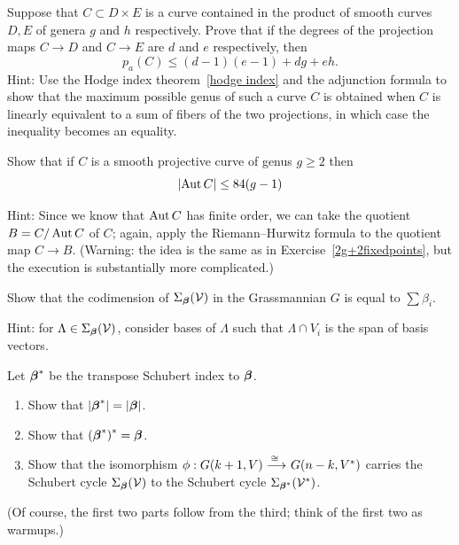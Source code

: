 \begin{exercise}\label{curve in a product}
Suppose that $C\subset D\times E$ is a curve contained in the product
of smooth curves $D,E$ of genera $g$ and $h$ respectively.
Prove that if the degrees of the projection maps $C \to D$ and $C\to E$
are $d$ and $e$ respectively,
then
$$
p_a(C)\leq (d-1)(e-1) +dg+eh.
$$
Hint:  Use the Hodge index theorem~\ref{hodge index} and the adjunction
%
%
formula to show that the maximum possible genus of such
a curve $C$ is obtained when $C$ is linearly equivalent to a sum of
fibers of the two projections, in which case the inequality
becomes an equality.
\end{exercise}

\begin{exercise}\label{84(g-1)}
Show that if $C$ is a smooth projective curve of genus $g \geq 2$ then
$$
|\!\operatorname{Aut} C| \leq 84(g-1)
$$

Hint: Since we know that $\operatorname{Aut} C$ has finite order, we can take
the quotient $B = C/\operatorname{Aut} C$ of $C$; again, apply 
the Riemann--Hurwitz formula
%
%
to the quotient map $C \to B$. (Warning: the idea is the same as in
Exercise~\ref{2g+2fixedpoints}, but the execution is substantially
more complicated.)
\end{exercise}


\begin{exercise}\label{codim Schubert}
Show that the codimension of $\Sigma_{{\boldsymbol{\beta}}}({\mathcal V})$ in the
%
Grassmannian $G$ is equal to $\sum \beta_i$.

Hint: for $\Lambda \in \Sigma_{{\boldsymbol{\beta}}}({\mathcal V})$, consider bases of
$\Lambda$ such that $\Lambda \cap V_i$ is the span of basis vectors.
\end{exercise}

\begin{exercise}\label{Schubert duality}
Let ${{\boldsymbol{\beta}}}^*$ be
the transpose Schubert index to ${\boldsymbol{\beta}}$.
\begin{enumerate}
\item  Show that $|{\boldsymbol{\beta}}^*| = |{\boldsymbol{\beta}}|$.
\item Show that $(\bbeta^*){\vphantom{\bbeta}}^* = \bbeta$. %
\item Show that the isomorphism $\phi : G(k+1, V) \ruto{\,\cong} 
G(n-k, V^*)$ carries the Schubert cycle $\Sigma_{\boldsymbol{\beta}}({\mathcal V})$ to the
Schubert cycle $\Sigma_{{\boldsymbol{\beta}}^*}({\mathcal V}^*)$.
\end{enumerate}
(Of course, the first two parts follow from the third; think of the
first two as warmups.)
\end{exercise}

